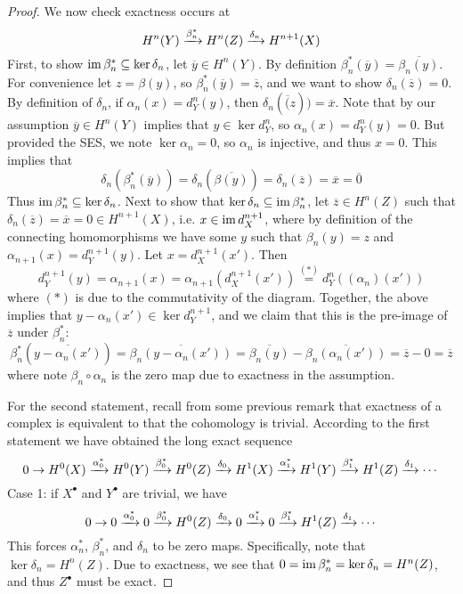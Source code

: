 \begin{proof}
    We now check exactness occurs at
    \[H^n(Y)\xrightarrow{\beta_n^*} H^n(Z)\xrightarrow{\delta_n} H^{n+1}(X)\]
    First, to show $\operatorname{im} \beta_n^*\subseteq \ker \delta_n$, let $\overline{y}\in H^n(Y)$. By definition $\beta_n^*(\overline y) = \overline{\beta_n(y)}$. For convenience let $z = \beta(y)$, so $\beta_n^*(\overline y) = \overline{z}$, and we want to show $\delta_n(\overline{z}) = 0$. By definition of $\delta_n$, if $\alpha_n(x) = d_Y^n(y)$, then $\delta_n(\overline(z)) = \overline x$. Note that by our assumption $\overline y\in H^n(Y)$ implies that $y\in \ker d_Y^{n}$, so $\alpha_n(x) = d_Y^{n}(y)=0$. But provided the SES, we note $\ker \alpha_n = 0$, so $\alpha_n$ is injective, and thus $x=0$. This implies that 
    \[\delta_n(\beta_n^*(\overline y)) = \delta_n(\overline{\beta(y)}) = \delta_n(\overline z) = \overline x = \overline 0\]
    Thus $\operatorname{im} \beta_n^* \subseteq \ker \delta_n$. Next to show that $\ker \delta_n\subseteq \operatorname{im} \beta_n^*$, let $\overline z\in H^n(Z)$ such that $\delta_n(\overline z) = \overline{x} = 0 \in H^{n+1}(X)$, i.e. $x\in \operatorname{im} d_X^{n+1}$, where by definition of the connecting homomorphisms we have some $y$ such that $\beta_n(y)=z$ and $\alpha_{n+1}(x) = d_{Y}^{n+1}(y)$. Let $x = d_X^{n+1}(x')$. Then 
    \[d_Y^{n+1}(y) = \alpha_{n+1}(x) = \alpha_{n+1}(d_X^{n+1}(x')) \overset{(*)}{=} d_Y^n ((\alpha_n)(x'))\]
    where $(*)$ is due to the commutativity of the diagram. Together, the above implies that $y-\alpha_n(x')\in \ker d_Y^{n+1}$, and we claim that this is the pre-image of $\overline{z}$ under $\beta_n^*$:
    \[\beta_n^*(\overline{y-\alpha_n(x')}) = \overline{\beta_n(y-\alpha_n(x'))} = \overline{\beta_n(y)} - \overline{\beta_n(\alpha_n(x'))} = \overline {z} - 0 = \overline{z}\]
    where note $\beta_n\circ \alpha_n$ is the zero map due to exactness in the assumption.
    
    For the second statement, recall from some previous remark that exactness of a complex is equivalent to that the cohomology is trivial. According to the first statement we have obtained the long exact sequence
    \[0 \to H^0(X) \xrightarrow{\alpha^*_0} H^0(Y) \xrightarrow{\beta^*_0} H^0(Z) \xrightarrow{\delta_0} H^1(X) \xrightarrow{\alpha^*_1} H^1(Y) \xrightarrow{\beta^*_1} H^1(Z) \xrightarrow{\delta_1} \cdots\]
    Case 1: if $X^\bullet$ and $Y^\bullet$ are trivial, we have 
    \[0 \to 0 \xrightarrow{\alpha^*_0} 0 \xrightarrow{\beta^*_0} H^0(Z) \xrightarrow{\delta_0} 0 \xrightarrow{\alpha^*_1} 0 \xrightarrow{\beta^*_1} H^1(Z) \xrightarrow{\delta_1} \cdots\]
    This forces $\alpha_n^*$, $\beta_n^*$, and $\delta_n$ to be zero maps. Specifically, note that $\ker \delta_n = H^n (Z)$. Due to exactness, we see that $0 = \operatorname{im} \beta_n^* = \ker \delta_n = H^n (Z)$, and thus $Z^\bullet$ must be exact.


\end{proof}
